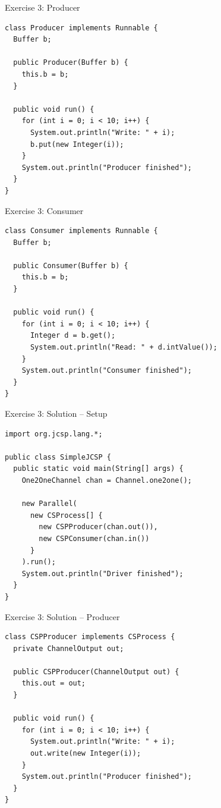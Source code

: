 \begin{frame}[fragile]{Exercise 3: Producer}
\begin{lstlisting}[basicstyle=\fontsize{9}{11}\selectfont\ttfamily]
class Producer implements Runnable {
  Buffer b;

  public Producer(Buffer b) {
    this.b = b;
  }

  public void run() {
    for (int i = 0; i < 10; i++) {
      System.out.println("Write: " + i);
      b.put(new Integer(i));
    }
    System.out.println("Producer finished");
  }
}
\end{lstlisting}
\end{frame}

\begin{frame}[fragile]{Exercise 3: Consumer}
\begin{lstlisting}[basicstyle=\fontsize{9}{11}\selectfont\ttfamily]
class Consumer implements Runnable {
  Buffer b;

  public Consumer(Buffer b) {
    this.b = b;
  }

  public void run() {
    for (int i = 0; i < 10; i++) {
      Integer d = b.get();
      System.out.println("Read: " + d.intValue());
    }
    System.out.println("Consumer finished");
  }
}
\end{lstlisting}
\end{frame}

\begin{frame}[fragile]{Exercise 3: Solution -- Setup}
\begin{lstlisting}[basicstyle=\fontsize{9}{11}\selectfont\ttfamily]
import org.jcsp.lang.*;

public class SimpleJCSP {
  public static void main(String[] args) {
    One2OneChannel chan = Channel.one2one();

    new Parallel(
      new CSProcess[] { 
        new CSPProducer(chan.out()),
        new CSPConsumer(chan.in()) 
      }
    ).run();
    System.out.println("Driver finished");
  }
}
\end{lstlisting}
\end{frame}

\begin{frame}[fragile]{Exercise 3: Solution -- Producer}
\begin{lstlisting}[basicstyle=\fontsize{9}{11}\selectfont\ttfamily]
class CSPProducer implements CSProcess {
  private ChannelOutput out;

  public CSPProducer(ChannelOutput out) {
    this.out = out;
  }

  public void run() {
    for (int i = 0; i < 10; i++) {
      System.out.println("Write: " + i);
      out.write(new Integer(i));
    }
    System.out.println("Producer finished");
  }
}
\end{lstlisting}
\end{frame}

